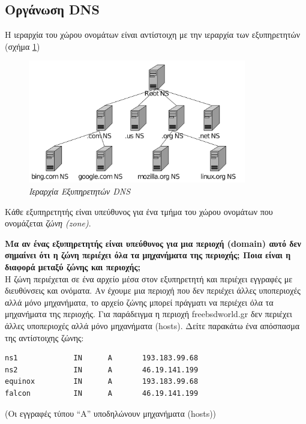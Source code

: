 %
%
\subsection{Οργάνωση DNS}

Η ιεραρχία του χώρου ονομάτων είναι αντίστοιχη με την ιεραρχία των εξυπηρετητών (σχήμα \ref{6-3})

\begin{figure}[!ht]
  \centering
  \includegraphics[width=0.85\textwidth]{images/chapter6/6-3}
  \caption {\textsl{Ιεραρχία Εξυπηρετητών DNS}}
  \label{6-3}
\end{figure}

Κάθε εξυπηρετητής είναι υπεύθυνος για ένα τμήμα του χώρου ονομάτων που ονομάζεται \emph{ζώνη (zone)}.

\parbox{\textwidth}{
\boxline
\textbf{Μα αν ένας εξυπηρετητής είναι υπεύθυνος για μια περιοχή (domain) αυτό δεν σημαίνει ότι η ζώνη περιέχει όλα τα μηχανήματα της περιοχής; Ποια είναι η διαφορά μεταξύ ζώνης και περιοχής;}\\

Η ζώνη περιέχεται σε ένα αρχείο μέσα στον εξυπηρετητή και περιέχει εγγραφές με διευθύνσεις και ονόματα. Αν έχουμε μια περιοχή που δεν περιέχει άλλες υποπεριοχές αλλά μόνο μηχανήματα, το αρχείο ζώνης μπορεί πράγματι να περιέχει όλα τα μηχανήματα της περιοχής. Για παράδειγμα η περιοχή freebsdworld.gr δεν περιέχει άλλες υποπεριοχές αλλά μόνο μηχανήματα (hosts). Δείτε παρακάτω ένα απόσπασμα της αντίστοιχης ζώνης:}

\begin{verbatim}
ns1             IN      A       193.183.99.68
ns2             IN      A       46.19.141.199
equinox         IN      A       193.183.99.68
falcon          IN      A       46.19.141.199
\end{verbatim}

(Οι εγγραφές τύπου ``Α'' υποδηλώνουν μηχανήματα (hosts))

